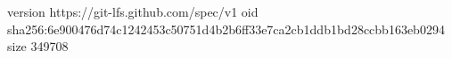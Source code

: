 version https://git-lfs.github.com/spec/v1
oid sha256:6e900476d74c1242453c50751d4b2b6ff33e7ca2cb1ddb1bd28ccbb163eb0294
size 349708
